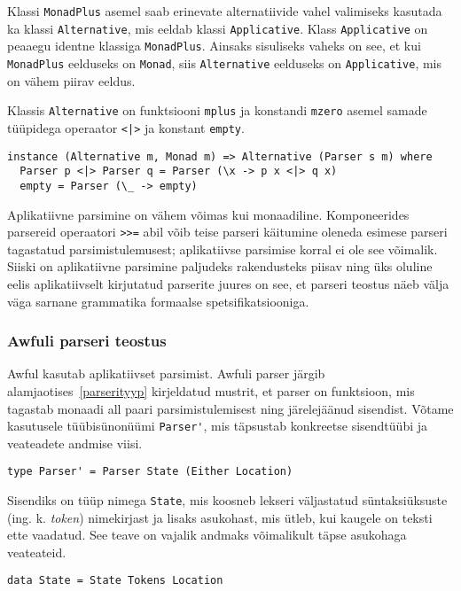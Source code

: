 \documentclass[12pt]{article}
\begin{document}
        Klassi \verb!MonadPlus! asemel saab erinevate alternatiivide vahel valimiseks kasutada ka klassi \verb!Alternative!, mis eeldab klassi \verb!Applicative!. Klass \verb!Applicative! on peaaegu identne klassiga \verb!MonadPlus!. Ainsaks sisuliseks vaheks on see, et kui \verb!MonadPlus! eelduseks on \verb!Monad!, siis \verb!Alternative! eelduseks on \verb!Applicative!, mis on vähem piirav eeldus.

        Klassis \verb!Alternative! on funktsiooni \verb!mplus! ja konstandi \verb!mzero! asemel samade tüüpidega operaator \verb!<|>! ja konstant \verb!empty!.

        \begin{verbatim}instance (Alternative m, Monad m) => Alternative (Parser s m) where
  Parser p <|> Parser q = Parser (\x -> p x <|> q x)
  empty = Parser (\_ -> empty)\end{verbatim}

        Aplikatiivne parsimine on vähem võimas kui monaadiline. Komponeerides parsereid operaatori \verb!>>=! abil võib teise parseri käitumine oleneda esimese parseri tagastatud parsimistulemusest; aplikatiivse parsimise korral ei ole see võimalik. Siiski on aplikatiivne parsimine paljudeks rakendusteks piisav ning üks oluline eelis aplikatiivselt kirjutatud parserite juures on see, et parseri teostus näeb välja väga sarnane grammatika formaalse spetsifikatsiooniga.
      \subsubsection{Awfuli parseri teostus}
        Awful kasutab aplikatiivset parsimist. Awfuli parser järgib alamjaotises~\ref{parserityyp} kirjeldatud mustrit, et parser on funktsioon, mis tagastab monaadi all paari parsimistulemisest ning järelejäänud sisendist. Võtame kasutusele tüübisünonüümi \verb!Parser'!, mis täpsustab konkreetse sisendtüübi ja veateadete andmise viisi.

        \begin{verbatim}type Parser' = Parser State (Either Location)\end{verbatim}

        Sisendiks on tüüp nimega \verb!State!, mis koosneb lekseri väljastatud süntaksiüksuste (ing. k. \textit{token}) nimekirjast ja lisaks asukohast, mis ütleb, kui kaugele on teksti ette vaadatud. See teave on vajalik andmaks võimalikult täpse asukohaga veateateid.

        \begin{verbatim}data State = State Tokens Location\end{verbatim}
\end{document}
